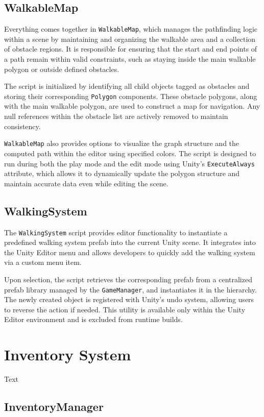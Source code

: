  
\subsection{WalkableMap}
Everything comes together in \verb|WalkableMap|, which manages the pathfinding logic within a scene by maintaining and organizing the walkable area and a collection of obstacle regions. It is responsible for ensuring that the start and end points of a path remain within valid constraints, such as staying inside the main walkable polygon or outside defined obstacles.

The script is initialized by identifying all child objects tagged as obstacles and storing their corresponding \verb|Polygon| components. These obstacle polygons, along with the main walkable polygon, are used to construct a map for navigation. Any null references within the obstacle list are actively removed to maintain consistency.

\verb|WalkableMap| also provides options to visualize the graph structure and the computed path within the editor using specified colors. The script is designed to run during both the play mode and the edit mode using Unity’s \verb|ExecuteAlways| attribute, which allows it to dynamically update the polygon structure and maintain accurate data even while editing the scene.


\subsection{WalkingSystem}
The \verb|WalkingSystem| script provides editor functionality to instantiate a predefined walking system prefab into the current Unity scene. It integrates into the Unity Editor menu and allows developers to quickly add the walking system via a custom menu item.

Upon selection, the script retrieves the corresponding prefab from a centralized prefab library managed by the \verb|GameManager|, and instantiates it in the hierarchy. The newly created object is registered with Unity’s undo system, allowing users to reverse the action if needed. This utility is available only within the Unity Editor environment and is excluded from runtime builds.


\section{Inventory System}
Text

\subsection{InventoryManager}


